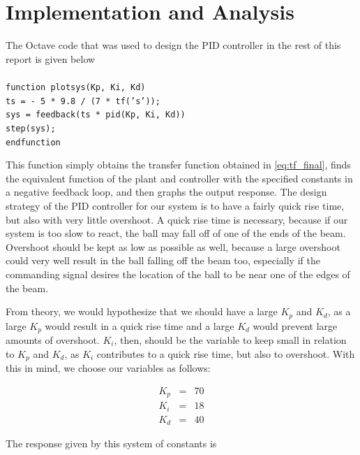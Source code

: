\documentclass[a4paper, 12pt]{article}
\begin{document}

\section{Implementation and Analysis}
	The Octave code that was used to design the PID controller in the rest of
	this report is given below\\\\\noindent
\texttt{function plotsys(Kp, Ki, Kd)\\\noindent
  ts = - 5 * 9.8 / (7 * tf('s'));\\\noindent
  sys = feedback(ts * pid(Kp, Ki, Kd))\\\noindent
  step(sys);\\\noindent
endfunction}\\\noindent

This function simply obtains the transfer function obtained in
\eqref{eq:tf_final}, finds the equivalent function of the plant and controller
with the specified constants in a negative feedback loop, and then graphs the
output response. The design strategy of the PID controller for our system is to
have a fairly quick rise time, but also with very little overshoot. A quick
rise time is necessary, because if our system is too slow to react, the ball
may fall off of one of the ends of the beam. Overshoot should be kept as low as
possible as well, because a large overshoot could very well result in the ball
falling off the beam too, especially if the commanding signal desires the
location of the ball to be near one of the edges of the beam.

From theory, we would hypothesize that we should have a large $K_p$ and $K_d$,
as a large $K_p$ would result in a quick rise time and a large $K_d$ would
prevent large amounts of overshoot. $K_i$, then, should be the variable to keep
small in relation to $K_p$ and $K_d$, as $K_i$ contributes to a quick rise
time, but also to overshoot. With this in mind, we choose our variables as
follows:

\begin{equation}
  \begin{array}{rcl}
	K_p & = & 70 \\
	K_i & = & 18 \\
	K_d & = & 40
  \end{array}
  \label{eq:pid_constants}
\end{equation}

The response given by this system of constants is
\end{document}
